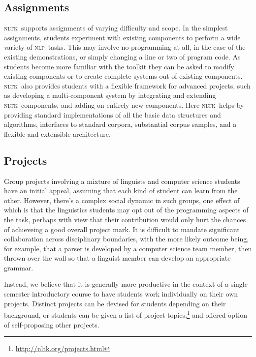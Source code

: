 \documentclass[11pt]{article}
\newcommand{\NLP}{\textsc{nlp}}
\newcommand{\NLTK}{\textsc{nltk}}
\begin{document}
\subsection{Assignments}
\NLTK\ supports assignments of varying difficulty and scope. In the
simplest assignments, students experiment with existing components to
perform a wide variety of \NLP\ tasks. This may involve no programming
at all, in the case of the existing demonstrations, or simply changing
a line or two of program code. As students become more familiar with
the toolkit they can be asked to modify existing components or to
create complete systems out of existing components. \NLTK\ also provides
students with a flexible framework for advanced projects, such as
developing a multi-component system by integrating and extending \NLTK\
components, and adding on entirely new components. Here \NLTK\ helps by
providing standard implementations of all the basic data structures
and algorithms, interfaces to standard corpora, substantial corpus
samples, and a flexible and extensible architecture.

\subsection{Projects}

Group projects involving a mixture of linguists and computer science
students have an initial appeal, assuming that each kind of student
can learn from the other.  However, there's a complex social dynamic
in such groups, one effect of which is that the linguistics students
may opt out of the programming aspects of the task, perhaps with view
that their contribution would only hurt the chances of achieveing a
good overall project mark. It is difficult to mandate significant
collaboration across disciplinary boundaries, with the more likely
outcome being, for example, that a parser is developed by a computer
science team member, then thrown over the wall so that a linguist
member can develop an appropriate grammar.

Instead, we believe that it is generally more productive in the
context of a single-semester introductory course to have students work individually
on their own projects.  Distinct projects can be devised for students
depending on their background, or students can be given a list of
project topics,\footnote{\url{http://nltk.org/projects.html}} and offered option of
self-proposing other projects.

\end{document}
